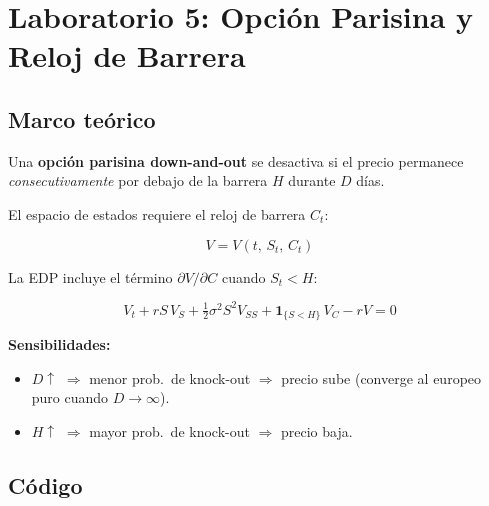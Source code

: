 \documentclass[12pt,letterpaper]{article}
\begin{document}
\section{Laboratorio 5: Opci\'on Parisina y Reloj de Barrera}

\subsection{Marco te\'orico}

Una \textbf{opci\'on parisina down-and-out} se desactiva si el precio permanece
\emph{consecutivamente} por debajo de la barrera $H$ durante $D$ d\'ias.

El espacio de estados requiere el reloj de barrera $C_t$:

\begin{equation}
  V = V(t,\, S_t,\, C_t)
\end{equation}

La EDP incluye el t\'ermino $\partial V/\partial C$ cuando $S_t < H$:

\begin{equation}
  V_t + rS\,V_S + \tfrac{1}{2}\sigma^2 S^2 V_{SS}
    + \mathbf{1}_{\{S < H\}}\,V_C - rV = 0
\end{equation}

\textbf{Sensibilidades:}
\begin{itemize}
  \item $D \uparrow$ $\Rightarrow$ menor prob.\ de knock-out $\Rightarrow$
    precio sube (converge al europeo puro cuando $D \to \infty$).
  \item $H \uparrow$ $\Rightarrow$ mayor prob.\ de knock-out $\Rightarrow$
    precio baja.
\end{itemize}

\subsection{C\'odigo}
\end{document}
